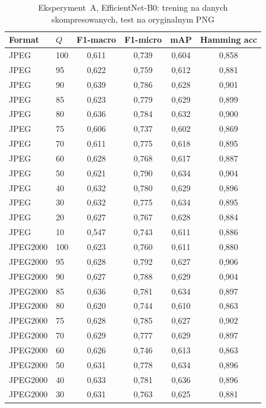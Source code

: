 \documentclass[12pt,a4paper]{article}
\begin{document}
\begin{table}[H]
\centering
\caption{Eksperyment~A, EfficientNet-B0: trening na danych skompresowanych, test na oryginalnym PNG}
\label{tab:exp_a_effnet}
\begin{tabular}{llcccc}
\toprule
Format & $Q$ & F1-macro & F1-micro & mAP & Hamming acc \\
\midrule
JPEG & 100 & 0{,}611 & 0{,}739 & 0{,}604 & 0{,}858 \\
JPEG & 95  & 0{,}622 & 0{,}759 & 0{,}612 & 0{,}881 \\
JPEG & 90  & 0{,}639 & 0{,}786 & 0{,}628 & 0{,}901 \\
JPEG & 85  & 0{,}623 & 0{,}779 & 0{,}629 & 0{,}899 \\
JPEG & 80  & 0{,}636 & 0{,}784 & 0{,}632 & 0{,}900 \\
JPEG & 75  & 0{,}606 & 0{,}737 & 0{,}602 & 0{,}869 \\
JPEG & 70  & 0{,}611 & 0{,}775 & 0{,}618 & 0{,}895 \\
JPEG & 60  & 0{,}628 & 0{,}768 & 0{,}617 & 0{,}887 \\
JPEG & 50  & 0{,}621 & 0{,}790 & 0{,}634 & 0{,}904 \\
JPEG & 40  & 0{,}632 & 0{,}780 & 0{,}629 & 0{,}896 \\
JPEG & 30  & 0{,}632 & 0{,}775 & 0{,}634 & 0{,}895 \\
JPEG & 20  & 0{,}627 & 0{,}767 & 0{,}628 & 0{,}884 \\
JPEG & 10  & 0{,}547 & 0{,}743 & 0{,}611 & 0{,}886 \\
\midrule
JPEG2000 & 100 & 0{,}623 & 0{,}760 & 0{,}611 & 0{,}880 \\
JPEG2000 & 95  & 0{,}628 & 0{,}792 & 0{,}627 & 0{,}906 \\
JPEG2000 & 90  & 0{,}627 & 0{,}788 & 0{,}629 & 0{,}904 \\
JPEG2000 & 85  & 0{,}636 & 0{,}781 & 0{,}634 & 0{,}897 \\
JPEG2000 & 80  & 0{,}620 & 0{,}744 & 0{,}610 & 0{,}863 \\
JPEG2000 & 75  & 0{,}628 & 0{,}785 & 0{,}627 & 0{,}902 \\
JPEG2000 & 70  & 0{,}629 & 0{,}777 & 0{,}629 & 0{,}897 \\
JPEG2000 & 60  & 0{,}626 & 0{,}746 & 0{,}613 & 0{,}863 \\
JPEG2000 & 50  & 0{,}631 & 0{,}778 & 0{,}634 & 0{,}896 \\
JPEG2000 & 40  & 0{,}633 & 0{,}781 & 0{,}636 & 0{,}896 \\
JPEG2000 & 30  & 0{,}631 & 0{,}763 & 0{,}625 & 0{,}881 \\

\end{tabular}
\end{table}
\end{document}
